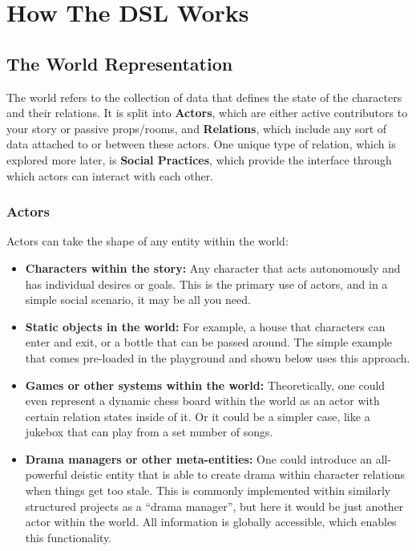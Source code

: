 \chapter{How The DSL Works} \label{sec:HowTheDSLWorks}

\section{The World Representation} \label{sec:TheWorldRepresentation}

The world refers to the collection of data that defines the state of the characters and
their relations. It is split into \textbf{Actors}, which are either active contributors to your
story or passive props\slash rooms, and \textbf{Relations}, which include any sort of data attached
to or between these actors. One unique type of relation, which is explored more later,
is \textbf{Social Practices}, which provide the interface through which actors can interact
with each other.

\subsection{Actors}

Actors can take the shape of any entity within the world:

\begin{itemize}
    \item \textbf{Characters within the story:} Any character that acts autonomously and has
    individual desires or goals. This is the primary use of actors, and in a simple
    social scenario, it may be all you need.
    \item \textbf{Static objects in the world:} For example, a house that characters can enter and
    exit, or a bottle that can be passed around. The simple example that comes pre-loaded
    in the playground and shown below uses this approach.
    \item \textbf{Games or other systems within the world:} Theoretically, one could even represent
    a dynamic chess board within the world as an actor with certain relation states inside
    of it. Or it could be a simpler case, like a jukebox that can play from a set number of
    songs.
    \item \textbf{Drama managers or other meta-entities:} One could introduce an all-powerful deistic
    entity that is able to create drama within character relations when things get too stale.
    This is commonly implemented within similarly structured projects as a “drama manager”,
    but here it would be just another actor within the world. All information is globally
    accessible, which enables this functionality.
\end{itemize}

